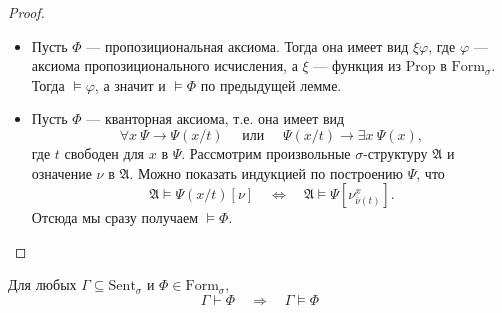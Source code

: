 \documentclass[12pt,a4paper]{article}
\newcommand{\Prop}{\ensuremath{\mathrm{Prop}}\xspace}
\newcommand{\Formul}{\ensuremath{\mathrm{Form}}\xspace}
\newcommand{\Sent}{\ensuremath{\mathrm{Sent}}\xspace}
\begin{document}
    \begin{proof}
        \begin{itemize}
            \item Пусть $\Phi$ --- пропозициональная аксиома. Тогда она имеет вид $\xi \varphi$, где $\varphi$ --- аксиома пропозиционального исчисления, а $\xi$ --- функция из $\Prop$ в $\Formul_\sigma$. Тогда $\vDash \varphi$, а значит и $\vDash \Phi$ по предыдущей лемме.

            \item Пусть $\Phi$ --- кванторная аксиома, т.е. она имеет вид
                \[
                    \forall x\ \Psi \rightarrow \Psi(x/t)
                    \quad \text{ или } \quad
                    \Psi(x/t) \rightarrow \exists x\ \Psi(x),
                \]
                где $t$ свободен для $x$ в $\Psi$. Рассмотрим произвольные $\sigma$-структуру $\mathfrak{A}$ и означение $\nu$ в $\mathfrak{A}$. Можно показать индукцией по построению $\Psi$, что
                \[
                    \mathfrak{A} \vDash \Psi(x/t) [\nu]
                    \quad \Longleftrightarrow \quad
                    \mathfrak{A} \vDash \Psi [\nu_{\overline{\nu}(t)}^x].
                \]
                Отсюда мы сразу получаем $\vDash \Phi$.
        \end{itemize}
    \end{proof}

    \begin{theorem}\label{Hilbert-conclusion-correctness-2}
        Для любых $\Gamma \subseteq \Sent_\sigma$ и $\Phi \in \Formul_\sigma$,
        \[
            \Gamma \vdash \Phi
            \quad \Longrightarrow \quad
            \Gamma \vDash \Phi
        \]
    \end{theorem}
\end{document}
